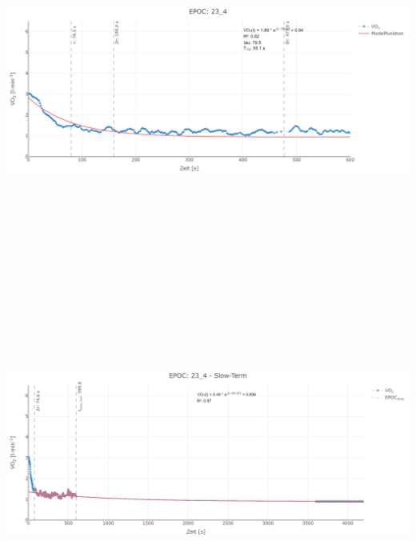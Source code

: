 \documentclass[
  letterpaper,
  DIV=11]{scrartcl}
\begin{document}
\includegraphics[width=11.45833in,height=4.6875in]{images/23_4_tau.png}
\includegraphics[width=11.45833in,height=4.6875in]{images/23_4_slow.png}
\end{document}
